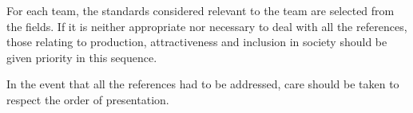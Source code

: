 %


\begin{hceresinstructions}
  For each team, the standards considered relevant to the team are
  selected from the fields. If it is neither appropriate nor necessary to
  deal with all the references, those relating to production,
  attractiveness and inclusion in society should be given priority in this
  sequence.

  In the event that all the references had to be addressed, care should be
  taken to respect the order of presentation.
\end{hceresinstructions}

\cite{DUMMY2}

